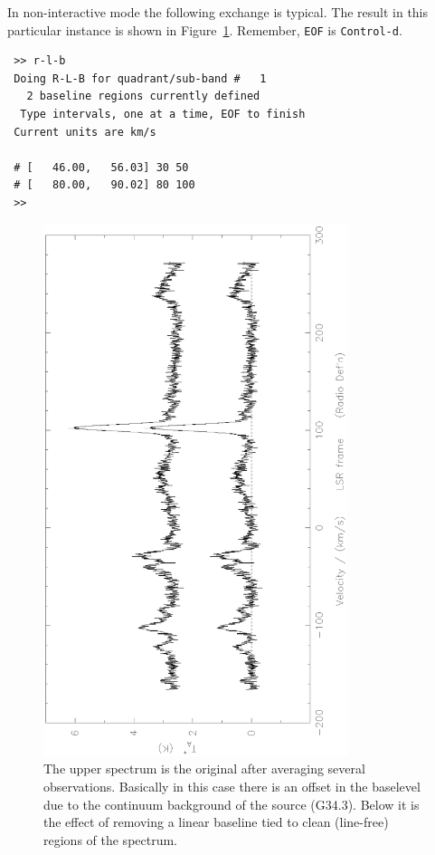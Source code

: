 \documentclass[11pt,twoside]{article}
\newcommand{\ctrld}{{\tt Control-d}}
\begin{document}
In non-interactive mode the following exchange is typical. The result
in this particular instance is shown in
Figure~\ref{fig:specx_rlb}. Remember, {\tt EOF} is \ctrld .
\begin{verbatim}
 >> r-l-b 
 Doing R-L-B for quadrant/sub-band #   1
   2 baseline regions currently defined
  Type intervals, one at a time, EOF to finish
 Current units are km/s  
 
 # [   46.00,   56.03] 30 50
 # [   80.00,   90.02] 80 100
 >> 
\end{verbatim}
%
\begin{figure}[htb]
\centering
\includegraphics[angle=-90,width=3.5in]{sc8_rlb.ps}
\vspace*{-0.5cm}
\begin{center}
\begin{minipage}[t]{5in}
\caption[Removing a linear baseline]
{\small{The upper spectrum is the original after averaging several
observations. Basically in this case there is an offset in the
baselevel due to the continuum background of the source (G34.3). Below
it is the effect of removing a linear baseline tied to clean
(line-free) regions of the spectrum.}  }
\label{fig:specx_rlb}
\end{minipage}
\end{center}
\end{figure}
 
\end{document}
